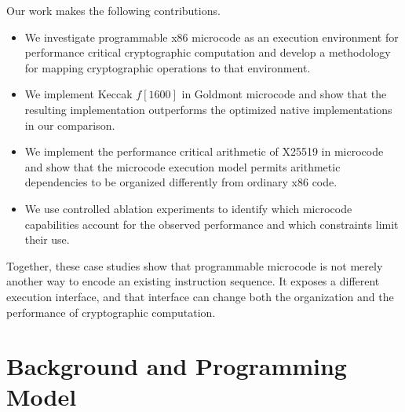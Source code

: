 \documentclass[journal=tches,submission]{iacrtrans}
\newcommand{\yvali}[1]{\todo[inline,color=darkviolet]{\textcolor{white}{\textbf{Yuval:} #1}}}
\begin{document}
Our work makes the following contributions.

\begin{itemize}

\item We investigate programmable x86 microcode as an execution environment for performance critical cryptographic computation and develop a methodology for mapping cryptographic operations to that environment.

\item We implement Keccak $f[1600]$ in Goldmont microcode and show that the resulting implementation outperforms the optimized native implementations in our comparison.

\item We implement the performance critical arithmetic of X25519 in microcode and show that the microcode execution model permits arithmetic dependencies to be organized differently from ordinary x86 code.

\item We use controlled ablation experiments to identify which microcode capabilities account for the observed performance and which constraints limit their use.

\end{itemize}

Together, these case studies show that programmable microcode is not merely another way to encode an existing instruction sequence. 
It exposes a different execution interface, and that interface can change both the organization and the performance of cryptographic computation.


\section{Background and Programming Model}
\label{sec:background}




\end{document}
